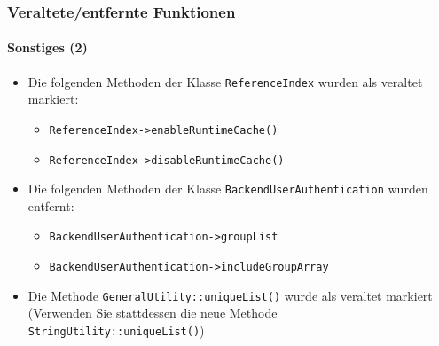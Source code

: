 %

\begin{frame}[fragile]
	\frametitle{Veraltete/entfernte Funktionen}
	\framesubtitle{Sonstiges (2)}

	\begin{itemize}
		\item Die folgenden Methoden der Klasse \texttt{ReferenceIndex} wurden als veraltet markiert:
			\begin{itemize}\smaller
				\item \texttt{ReferenceIndex->enableRuntimeCache()}
				\item \texttt{ReferenceIndex->disableRuntimeCache()}
			\end{itemize}\normalsize

		\item Die folgenden Methoden der Klasse \texttt{BackendUserAuthentication} wurden entfernt:
			\begin{itemize}\smaller
				\item \texttt{BackendUserAuthentication->groupList}
				\item \texttt{BackendUserAuthentication->includeGroupArray}
			\end{itemize}\normalsize

		\item Die Methode \texttt{GeneralUtility::uniqueList()} wurde als veraltet markiert
			(Verwenden Sie stattdessen die neue Methode \smaller\texttt{StringUtility::uniqueList()}\normalsize)

	\end{itemize}

\end{frame}

